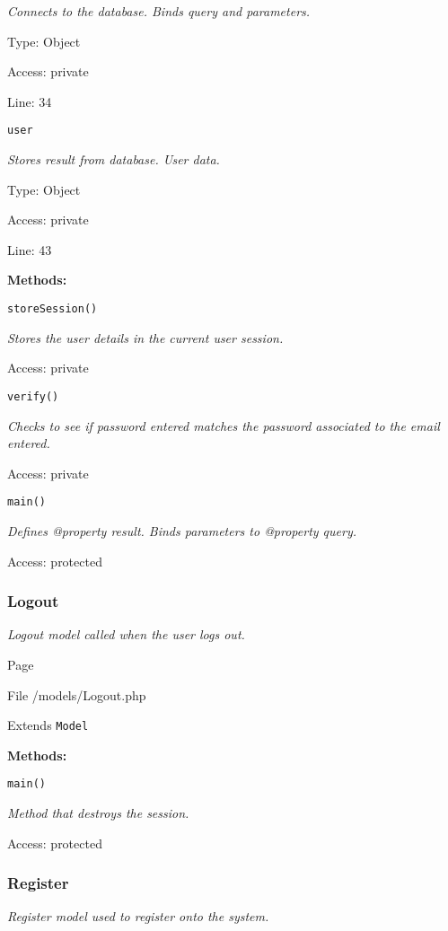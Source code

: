 {\scriptsize
\textit{Connects to the database.
Binds query and parameters.}

Type: Object

Access: private

Line: 34

}
\texttt{user}

{\scriptsize
\textit{Stores result from database.
User data.}

Type: Object

Access: private

Line: 43

}
\textbf{Methods:}

\texttt{storeSession()}

{\scriptsize
\textit{Stores the user details in the current user session.}

Access: private

}

\texttt{verify()}

{\scriptsize
\textit{Checks to see if password entered matches the password associated to the email entered.}

Access: private

}

\texttt{main()}

{\scriptsize
\textit{Defines @property result.
Binds parameters to @property query.}

Access: protected

}

\subsubsection{Logout}
\textit{Logout model called when the user logs out.}

Page \pageref{Logout.php}

File /models/Logout.php

Extends \texttt{Model}

\textbf{Methods:}

\texttt{main()}

{\scriptsize
\textit{Method that destroys the session.}

Access: protected

}

\subsubsection{Register}
\textit{Register model used to register onto the system.}

